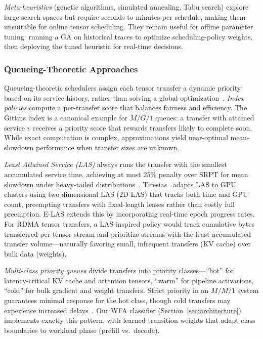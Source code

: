 \documentclass[11pt,letterpaper]{article}
\theoremstyle{definition}
\begin{document}
\emph{Meta-heuristics} (genetic algorithms, simulated annealing, Tabu search) explore large search spaces but require seconds to minutes per schedule, making them unsuitable for online tensor scheduling. They remain useful for offline parameter tuning: running a GA on historical traces to optimize scheduling-policy weights, then deploying the tuned heuristic for real-time decisions.

\subsubsection{Queueing-Theoretic Approaches}

Queueing-theoretic schedulers assign each tensor transfer a dynamic priority based on its service history, rather than solving a global optimization~\cite{gpu-scheduling-survey}. \emph{Index policies} compute a per-transfer score that balances fairness and efficiency. The Gittins index is a canonical example for $M/G/1$ queues: a transfer with attained service $v$ receives a priority score that rewards transfers likely to complete soon. While exact computation is complex, approximations yield near-optimal mean-slowdown performance when transfer sizes are unknown.

\emph{Least Attained Service (LAS)} always runs the transfer with the smallest accumulated service time, achieving at most 25\% penalty over SRPT for mean slowdown under heavy-tailed distributions~\cite{gpu-scheduling-survey}. Tiresias~\cite{tiresias2019} adapts LAS to GPU clusters using two-dimensional LAS (2D-LAS) that tracks both time and GPU count, preempting transfers with fixed-length leases rather than costly full preemption. E-LAS extends this by incorporating real-time epoch progress rates. For RDMA tensor transfers, a LAS-inspired policy would track cumulative bytes transferred per tensor stream and prioritize streams with the least accumulated transfer volume---naturally favoring small, infrequent transfers (KV cache) over bulk data (weights).

\emph{Multi-class priority queues} divide transfers into priority classes---``hot'' for latency-critical KV cache and attention tensors, ``warm'' for pipeline activations, ``cold'' for bulk gradient and weight transfers. Strict priority in an $M/M/1$ system guarantees minimal response for the hot class, though cold transfers may experience increased delays~\cite{gpu-scheduling-survey}. Our WFA classifier (Section~\ref{sec:architecture}) implements exactly this pattern, with learned transition weights that adapt class boundaries to workload phase (prefill vs.\ decode).
\end{document}
